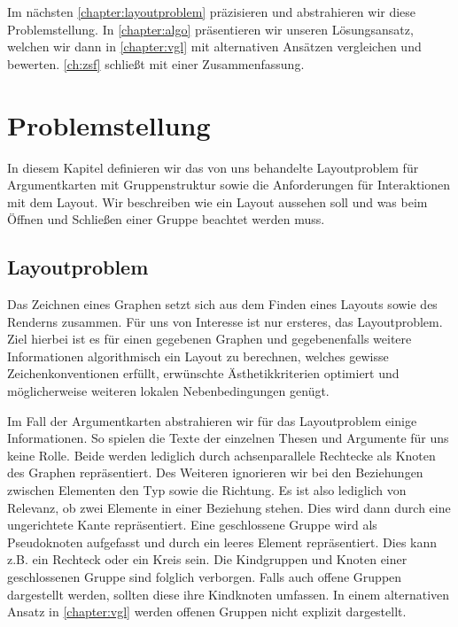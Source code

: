 Im nächsten \autoref{chapter:layoutproblem}  präzisieren und abstrahieren wir diese Problemstellung. 
In \autoref{chapter:algo} präsentieren wir unseren Lösungsansatz, welchen wir dann in \autoref{chapter:vgl} mit alternativen Ansätzen vergleichen und bewerten.
\autoref{ch:zsf} schließt mit einer Zusammenfassung.

\chapter{Problemstellung}%
\label{chapter:layoutproblem}
In diesem Kapitel definieren wir das von uns behandelte Layoutproblem für Argumentkarten mit Gruppenstruktur sowie die Anforderungen für Interaktionen mit dem Layout.
Wir beschreiben wie ein Layout aussehen soll und was beim Öffnen und Schließen einer Gruppe beachtet werden muss.

\section{Layoutproblem}
\label{sec:layoutproblem}
Das Zeichnen eines Graphen setzt sich aus dem Finden eines Layouts sowie des Renderns zusammen. 
Für uns von Interesse ist nur ersteres, das Layoutproblem. 
Ziel hierbei ist es für einen gegebenen Graphen und gegebenenfalls weitere Informationen algorithmisch ein Layout zu berechnen,
welches gewisse Zeichenkonventionen erfüllt, erwünschte Ästhetikkriterien optimiert und möglicherweise weiteren lokalen Nebenbedingungen genügt.

Im Fall der Argumentkarten abstrahieren wir für das Layoutproblem einige Informationen. 
So spielen die Texte der einzelnen Thesen und Argumente für uns keine Rolle. 
Beide werden lediglich durch achsenparallele Rechtecke als Knoten des Graphen repräsentiert.
Des Weiteren ignorieren wir bei den Beziehungen zwischen Elementen den Typ sowie die Richtung. 
Es ist also lediglich von Relevanz, ob zwei Elemente in einer Beziehung stehen.
Dies wird dann durch eine ungerichtete Kante repräsentiert. 
Eine geschlossene Gruppe wird als Pseudoknoten aufgefasst und durch ein leeres Element repräsentiert.
Dies kann  z.B. ein Rechteck oder ein Kreis sein.  Die Kindgruppen und Knoten einer geschlossenen Gruppe sind folglich verborgen.
Falls auch offene Gruppen dargestellt werden, sollten diese ihre Kindknoten umfassen. 
In einem  alternativen Ansatz in \autoref{chapter:vgl} werden offenen Gruppen nicht explizit dargestellt.


